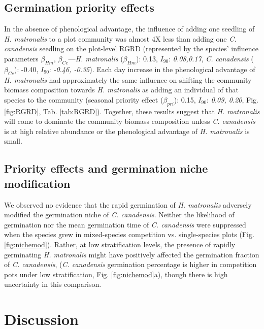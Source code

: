 \documentclass{article}[11pt]
\begin{document}
\subsection*{Germination priority effects}
In the absence of phenological advantage, the influence  of adding one seedling of \textit{H. matronalis} to a plot community was almost 4X less than adding one \textit{C. canadensis} seedling on the plot-level RGRD (represented by the species' influence parameters $\beta_{Hm}$, $\beta_{Cc}$---\textit{H. matronalis} ($\beta_{Hm}$): 0.13, $I_{90}$: \textit{0.08,0.17}, \textit{C. canadensis} ($\beta_{Cc}$): -0.40, $I_{90}$: \textit{-0.46, -0.35}). Each day increase in the phenological advantage of \textit{ H. matronalis} had approximately the same influence on shifting the community biomass composition towards \textit{H. matronalis} as adding an individual of that species to the community (seasonal priority effect ($\beta_{pri}$): 0.15, $I_{90}$: \textit{0.09, 0.20}, Fig. \ref{fig:RGRD}, Tab. \ref{tab:RGRD}). Together, these results suggest that \textit{H. matronalis} will come to dominate the community biomass composition unless \textit{C. canadensis} is at high relative abundance or the phenological advantage of \textit{H. matronalis} is small. %

\subsection*{Priority effects and germination niche modification}
We observed no evidence that the rapid germination of \textit{H. matronalis} adversely modified the germination niche of \textit{C. canadensis}. Neither the likelihood of germination nor the mean germination time of \textit{C. canadensis} were suppressed when the species grew in mixed-species competition vs. single-species plots (Fig. \ref{fig:nichemod}). Rather, at low stratification levels, the presence of rapidly germinating \textit{H. matronalis} might have positively affected the germination fraction of \textit{C. canadensis}, (\textit{C. canadensis} germination percentage is higher in competition pots under low stratification, Fig. \ref{fig:nichemod}a), though there is high uncertainty in this comparison.

\section*{Discussion}
\end{document}
